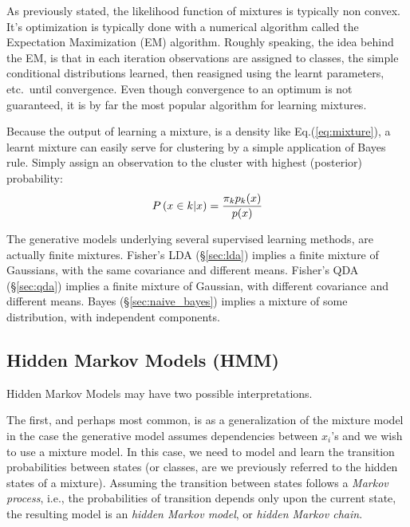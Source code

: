 \begin{remark}
As previously stated, the likelihood function of mixtures is typically non convex. 
It's optimization is typically done with a numerical algorithm called the Expectation Maximization (EM) algorithm.
Roughly speaking, the idea behind the EM, is that in each iteration observations are assigned to classes, the simple conditional distributions learned, then reasigned using the learnt parameters, etc.\ until convergence.
Even though convergence to an optimum is not guaranteed, it is by far the most popular algorithm for learning mixtures.
\end{remark}



\begin{remark}
Because the output of learning a mixture, is a density like Eq.(\ref{eq:mixture}), a learnt mixture can easily serve for clustering by a simple application of Bayes rule. Simply assign an observation to the cluster with highest (posterior) probability:
\begin{align}
\label{eq:mixture_posterior}
	P\left( x \in k|x \right)=\frac{\pi_k p_k(x)}{p(x)}
\end{align}
\end{remark}



\begin{remark}
The generative models underlying several supervised learning methods, are actually finite mixtures.
Fisher's LDA (\S\ref{sec:lda}) implies a finite mixture of Gaussians, with the same covariance and different means.
Fisher's QDA (\S\ref{sec:qda}) implies a finite mixture of Gaussian, with different covariance and different means.
\Naive Bayes (\S\ref{sec:naive_bayes}) implies a mixture of some distribution, with independent components.
\end{remark}





\subsection{Hidden Markov Models (HMM)}
\label{sec:hmm}
Hidden Markov Models may have two possible interpretations.

The first, and perhaps most common, is as a generalization of the mixture model in the case the generative model assumes dependencies between $x_i$'s and we wish to use a mixture model. 
In this case, we need to model and learn the transition probabilities between states (or classes, are we previously referred to the hidden states of a mixture). 
Assuming the transition between states follows a \emph{Markov process}, i.e., the probabilities of transition depends only upon the current state, the resulting model is an \emph{hidden Markov model}, or \emph{hidden Markov chain}.


